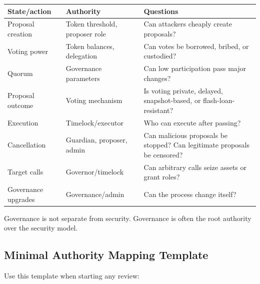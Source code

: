 {\def\LTcaptype{none} %
\begin{longtable}[]{@{}
  >{\raggedright\arraybackslash}p{}
  >{\raggedright\arraybackslash}p{}
  >{\raggedright\arraybackslash}p{}@{}}
\toprule\noalign{}
\begin{minipage}[b]{\linewidth}\raggedright
State/action
\end{minipage} & \begin{minipage}[b]{\linewidth}\raggedright
Authority
\end{minipage} & \begin{minipage}[b]{\linewidth}\raggedright
Questions
\end{minipage} \\
\midrule\noalign{}
\endhead
\bottomrule\noalign{}
\endlastfoot
Proposal creation & Token threshold, proposer role & Can attackers
cheaply create proposals? \\
Voting power & Token balances, delegation & Can votes be borrowed,
bribed, or custodied? \\
Quorum & Governance parameters & Can low participation pass major
changes? \\
Proposal outcome & Voting mechanism & Is voting private, delayed,
snapshot-based, or flash-loan-resistant? \\
Execution & Timelock/executor & Who can execute after passing? \\
Cancellation & Guardian, proposer, admin & Can malicious proposals be
stopped? Can legitimate proposals be censored? \\
Target calls & Governor/timelock & Can arbitrary calls seize assets or
grant roles? \\
Governance upgrades & Governance/admin & Can the process change
itself? \\
\end{longtable}
}

Governance is not separate from security. Governance is often the root
authority over the security model.

\subsection{Minimal Authority Mapping Template}

Use this template when starting any review:

